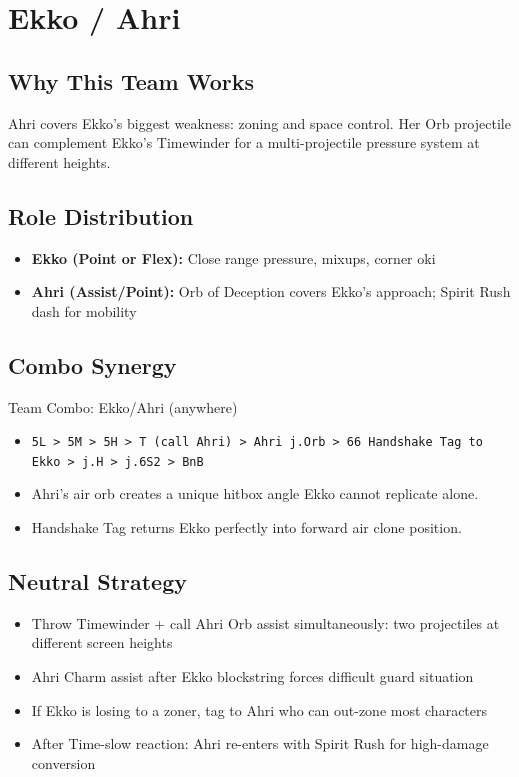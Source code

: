 \documentclass[12pt, a4paper]{report}
\newcommand{\notation}[1]{{\small\texttt{\textcolor{ekkoBlue}{#1}}}}
\begin{document}
\section{Ekko / Ahri}

\subsection{Why This Team Works}

Ahri covers Ekko's biggest weakness: zoning and space control. Her Orb projectile can complement Ekko's Timewinder for a multi-projectile pressure system at different heights.

\subsection{Role Distribution}

\begin{itemize}
  \item \textbf{Ekko (Point or Flex):} Close range pressure, mixups, corner oki
  \item \textbf{Ahri (Assist/Point):} Orb of Deception covers Ekko's approach; Spirit Rush dash for mobility
\end{itemize}

\subsection{Combo Synergy}

\begin{combobox}[]{Team Combo: Ekko/Ahri (anywhere)}
\begin{itemize}
  \item \notation{5L > 5M > 5H > T (call Ahri) > Ahri j.Orb > 66 Handshake Tag to Ekko > j.H > j.6S2 > BnB}
  \item Ahri's air orb creates a unique hitbox angle Ekko cannot replicate alone.
  \item Handshake Tag returns Ekko perfectly into forward air clone position.
\end{itemize}
\end{combobox}

\subsection{Neutral Strategy}

\begin{itemize}
  \item Throw Timewinder + call Ahri Orb assist simultaneously: two projectiles at different screen heights
  \item Ahri Charm assist after Ekko blockstring forces difficult guard situation
  \item If Ekko is losing to a zoner, tag to Ahri who can out-zone most characters
  \item After Time-slow reaction: Ahri re-enters with Spirit Rush for high-damage conversion
\end{itemize}
\end{document}
